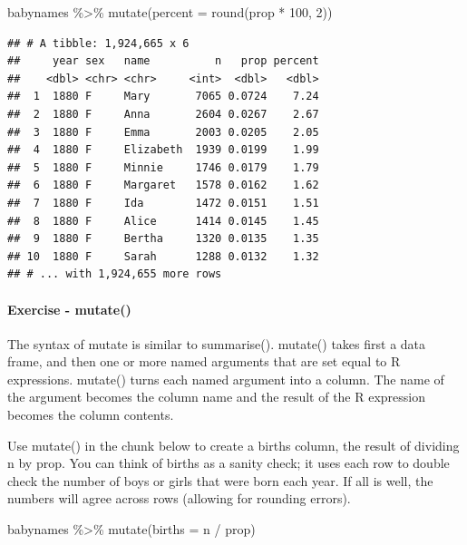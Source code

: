 \documentclass[
]{article}
\newenvironment{Shaded}{\begin{snugshade}}{\end{snugshade}}
\newcommand{\AttributeTok}[1]{\textcolor[rgb]{0.77,0.63,0.00}{#1}}
\newcommand{\DecValTok}[1]{\textcolor[rgb]{0.00,0.00,0.81}{#1}}
\newcommand{\FunctionTok}[1]{\textcolor[rgb]{0.00,0.00,0.00}{#1}}
\newcommand{\NormalTok}[1]{#1}
\newcommand{\SpecialCharTok}[1]{\textcolor[rgb]{0.00,0.00,0.00}{#1}}
\begin{document}
\begin{Shaded}
\begin{Highlighting}[]
\NormalTok{babynames }\SpecialCharTok{\%\textgreater{}\%}
  \FunctionTok{mutate}\NormalTok{(}\AttributeTok{percent =} \FunctionTok{round}\NormalTok{(prop }\SpecialCharTok{*} \DecValTok{100}\NormalTok{, }\DecValTok{2}\NormalTok{))}
\end{Highlighting}
\end{Shaded}

\begin{verbatim}
## # A tibble: 1,924,665 x 6
##     year sex   name          n   prop percent
##    <dbl> <chr> <chr>     <int>  <dbl>   <dbl>
##  1  1880 F     Mary       7065 0.0724    7.24
##  2  1880 F     Anna       2604 0.0267    2.67
##  3  1880 F     Emma       2003 0.0205    2.05
##  4  1880 F     Elizabeth  1939 0.0199    1.99
##  5  1880 F     Minnie     1746 0.0179    1.79
##  6  1880 F     Margaret   1578 0.0162    1.62
##  7  1880 F     Ida        1472 0.0151    1.51
##  8  1880 F     Alice      1414 0.0145    1.45
##  9  1880 F     Bertha     1320 0.0135    1.35
## 10  1880 F     Sarah      1288 0.0132    1.32
## # ... with 1,924,655 more rows
\end{verbatim}

\hypertarget{exercise---mutate}{%
\paragraph{Exercise - mutate()}\label{exercise---mutate}}

The syntax of mutate is similar to summarise(). mutate() takes first a
data frame, and then one or more named arguments that are set equal to R
expressions. mutate() turns each named argument into a column. The name
of the argument becomes the column name and the result of the R
expression becomes the column contents.

Use mutate() in the chunk below to create a births column, the result of
dividing n by prop. You can think of births as a sanity check; it uses
each row to double check the number of boys or girls that were born each
year. If all is well, the numbers will agree across rows (allowing for
rounding errors).

\begin{Shaded}
\begin{Highlighting}[]
\NormalTok{babynames }\SpecialCharTok{\%\textgreater{}\%} 
   \FunctionTok{mutate}\NormalTok{(}\AttributeTok{births =}\NormalTok{ n }\SpecialCharTok{/}\NormalTok{ prop)}
\end{Highlighting}
\end{Shaded}
\end{document}

